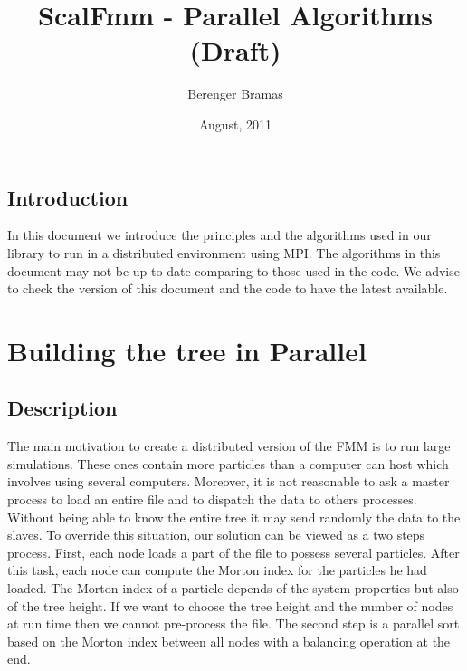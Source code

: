 \documentclass[12pt,letterpaper,titlepage]{report}
\author{Berenger Bramas}
\title{ScalFmm - Parallel Algorithms (Draft)}
\date{August, 2011}
\begin{document}
\maketitle{}
\newpage
\tableofcontents
\newpage
\section{Introduction}
In this document we introduce the principles and the algorithms used in our library to run in a distributed environment using MPI.
The algorithms in this document may not be up to date comparing to those used in the code.
We advise to check the version of this document and the code to have the latest available.
\chapter{Building the tree in Parallel}
\section{Description}
The main motivation to create a distributed version of the FMM is to run large simulations.
These ones contain more particles than a computer can host which involves using several computers.
Moreover, it is not reasonable to ask a master process to load an entire file and to dispatch the data to others processes. Without being able to know the entire tree it may send randomly the data to the slaves.
To override this situation, our solution can be viewed as a two steps process.
First, each node loads a part of the file to possess several particles.
After this task, each node can compute the Morton index for the particles he had loaded.
The Morton index of a particle depends of the system properties but also of the tree height.
If we want to choose the tree height and the number of nodes at run time then we cannot pre-process the file.
The second step is a parallel sort based on the Morton index between all nodes with a balancing operation at the end.
\end{document}

